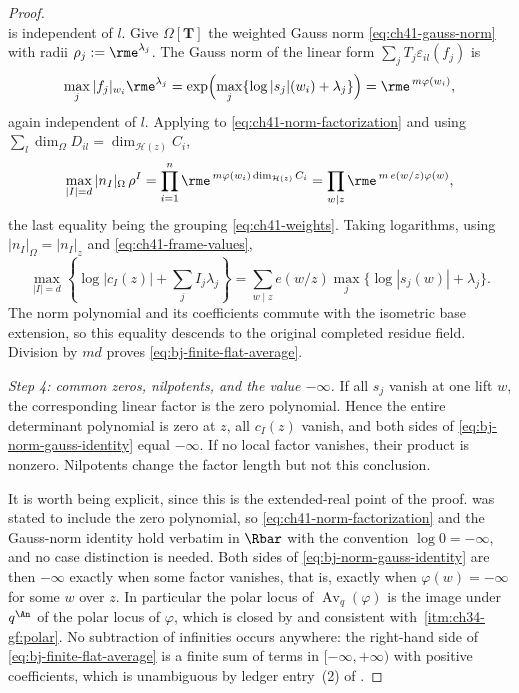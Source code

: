 \begin{proof}
\[\]
is independent of $l$.  Give $\Omega[\mathbf T]$ the weighted Gauss
norm \eqref{eq:ch41-gauss-norm} with radii
$\rho_j:=\rme^{\lambda_j}$.  The Gauss norm of the linear form
$\sum_jT_j\varepsilon_{il}(f_j)$ is
\[
 \max_j|f_j|_{w_i}\rme^{\lambda_j}
 =\exp\Bigl(\max_j\{\log|s_j|(w_i)+\lambda_j\}\Bigr)
 =\rme^{\,m\varphi(w_i)} ,
\]
again independent of $l$.  Applying
 to
\eqref{eq:ch41-norm-factorization} and using
$\sum_l\dim_\Omega D_{il}=\dim_{\mathcal H(z)}C_i$,
\[
 \max_{|I|=d}|n_I|_\Omega\,\rho^I
 =\prod_{i=1}^n\rme^{\,m\varphi(w_i)\dim_{\mathcal H(z)}C_i}
 =\prod_{w\mid z}\rme^{\,m\,e(w/z)\varphi(w)} ,
\]
the last equality being the grouping \eqref{eq:ch41-weights}.  Taking
logarithms, using $|n_I|_\Omega=|n_I|_z$ and
\eqref{eq:ch41-frame-values},
\[
 \max_{|I|=d}
 \left\{\log|c_I(z)|+\sum_jI_j\lambda_j\right\}
 =
 \sum_{w\mid z}e(w/z)
 \max_j\{\log|s_j(w)|+\lambda_j\}.
\tag{41.31}\label{eq:bj-norm-gauss-identity}
\]
The norm polynomial and its coefficients commute with the isometric base
extension, so this equality descends to the original completed residue
field.  Division by $md$ proves
\eqref{eq:bj-finite-flat-average}.

\medskip
\noindent\emph{Step 4: common zeros, nilpotents, and the value $-\infty$.}
If all $s_j$ vanish at one lift $w$, the corresponding linear factor
is the zero polynomial.  Hence the entire determinant polynomial is zero
at $z$, all $c_I(z)$ vanish, and both sides of
\eqref{eq:bj-norm-gauss-identity} equal $-\infty$.  If no local factor
vanishes, their product is nonzero.  Nilpotents change the factor length
but not this conclusion.

It is worth being explicit, since this is the extended-real point of the
proof.   was stated to include the zero
polynomial, so \eqref{eq:ch41-norm-factorization} and the Gauss-norm
identity hold verbatim in $\Rbar$ with the convention
$\log0=-\infty$, and no case distinction is needed.  Both sides of
\eqref{eq:bj-norm-gauss-identity} are then $-\infty$ exactly when some
factor vanishes, that is, exactly when $\varphi(w)=-\infty$ for some
$w$ over $z$.  In particular the polar locus of
$\operatorname{Av}_q(\varphi)$ is the image under $q^{\An}$ of the polar
locus of $\varphi$, which is closed by
 and consistent with
\,\cref{itm:ch34-gf:polar}.  No
subtraction of infinities occurs anywhere: the right-hand side of
\eqref{eq:bj-finite-flat-average} is a finite sum of terms in
$[-\infty,+\infty)$ with positive coefficients, which is unambiguous by
ledger entry~(2) of .


\end{proof}
